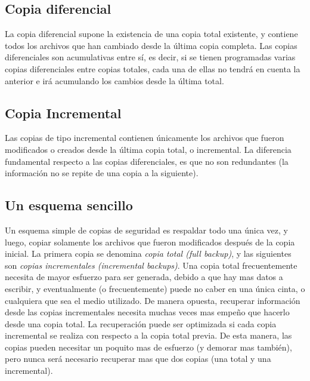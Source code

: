 \documentclass[12pt]{article}
\begin{document}
\subsection*{Copia diferencial}
La copia diferencial supone la existencia de una copia total existente, y
contiene todos los archivos que han cambiado desde la última
copia completa. Las copias diferenciales son acumulativas entre sí, es 
decir, si se tienen programadas varias copias diferenciales entre copias
 totales, cada una de ellas no tendrá en cuenta la anterior e irá 
acumulando los cambios desde la última total.

\subsection*{Copia Incremental}
Las copias de tipo incremental contienen únicamente los archivos que fueron
modificados o creados desde la última copia total, o incremental. La 
diferencia fundamental respecto a las copias diferenciales, es que no son 
redundantes (la información no se repite de una copia a la siguiente).

\subsection{Un esquema sencillo}

Un esquema simple de copias de seguridad es respaldar todo una única vez, 
y luego, copiar solamente los archivos que fueron modificados después de 
la copia inicial. La primera copia se denomina \textit{copia total (full 
backup)}, y las siguientes son \textit{copias incrementales 
(incremental backups)}. Una copia total frecuentemente necesita de mayor 
esfuerzo para ser generada, debido a que hay mas datos a escribir,
y eventualmente (o frecuentemente) puede no caber en una única cinta, o 
cualquiera que sea el medio utilizado.
De manera opuesta, recuperar información desde las copias
incrementales necesita muchas veces mas empeño que hacerlo desde una copia 
total. La recuperación puede ser optimizada si cada copia incremental se 
realiza con respecto a la copia total previa. De esta manera, las copias 
pueden necesitar un poquito mas de esfuerzo (y demorar mas también), 
pero nunca será necesario recuperar mas que dos copias (una total y una 
incremental).
\end{document}

